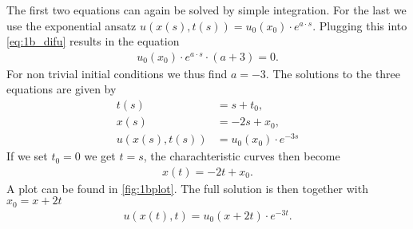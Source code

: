 The first two equations can again be solved by simple integration. For the last we use the exponential ansatz $u(x(s),t(s)) = u_0(x_0)\cdot e^{a\cdot s}$. Plugging this into \cref{eq:1b_difu} results in the equation
\begin{align}
 u_0(x_0)\cdot e^{a\cdot s}\cdot(a+3) = 0.
\end{align}
For non trivial initial conditions we thus find $a=-3$. The solutions to the three equations are given by 
\begin{align}
t(s)&=s+t_0,\\
x(s)&=-2s+x_0,\\
u(x(s),t(s))&=u_0(x_0)\cdot e^{-3s}
\end{align}
If we set $t_0=0$ we get $t=s$, the charachteristic curves then become
\begin{align}
x(t)=-2t+x_0.\label{eq:1b_charch_curve}
\end{align}
A plot can be found in \cref{fig:1bplot}.
The full solution is then together with $x_0=x+2t$
\begin{align}
u(x(t),t)=u_0(x+2t)\cdot e^{-3t}.
\end{align}
\begin{figure}
\hfill
{}
\end{figure}